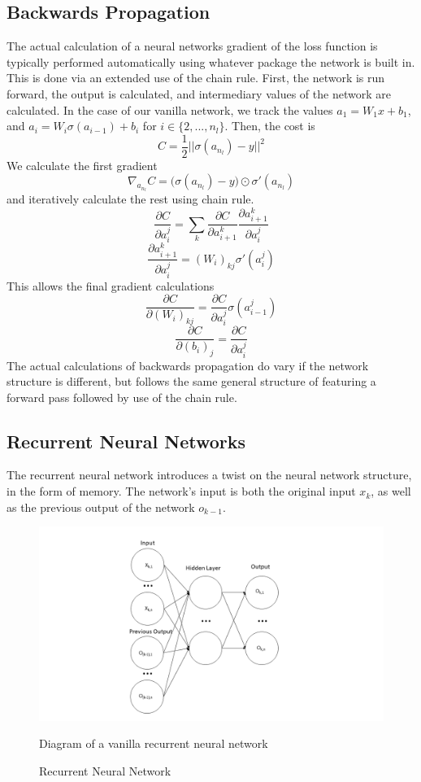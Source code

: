 \subsection{Backwards Propagation}
The actual calculation of a neural networks gradient of the loss function is typically performed automatically using whatever package the network is built in. This is done via an extended use of the chain rule. First, the network is run forward, the output is calculated, and intermediary values of the network are calculated. In the case of our vanilla network, we track the values $a_1 = W_1x + b_1$, and $a_i = W_i\sigma(a_{i-1})+b_i$ for $i\in\{2,...,n_l\}$. Then, the cost is \[C = \frac{1}{2}||\sigma(a_{n_l})-y||^2\] We calculate the first gradient \[\nabla_{a_{n_l}} C = \Big(\sigma(a_{n_l})-y\Big)\odot\sigma'(a_{n_l})\] and iteratively calculate the rest using chain rule. \[\frac{\partial C}{\partial{a_i^j}}= \sum_k\frac{\partial C}{\partial a_{i+1}^k}\frac{\partial  a_{i+1}^k}{\partial{a_i^j}}\] \[\frac{\partial  a_{i+1}^k}{\partial{a_i^j}} = (W_i)_{kj} \sigma'(a_i^j)\] 
This allows the final gradient calculations \[\frac{\partial C}{\partial (W_i)_{kj}} = \frac{\partial C}{\partial a_i^j}\sigma(a_{i-1}^j)\]
 \[\frac{\partial C}{\partial (b_i)_{j}} = \frac{\partial C}{\partial a_i^j}\]
 The actual calculations of backwards propagation do vary if the network structure is different, but follows the same general structure of featuring a forward pass followed by use of the chain rule.
\subsection{Recurrent Neural Networks }The recurrent neural network introduces a twist on the neural network structure, in the form of memory. The network's input is both the original input $x_k$, as well as the previous output of the network $o_{k-1}$.
\begin{figure}
    \centering
    \includegraphics[width=1.0\textwidth]{figures/RNN.png}
    \caption{Recurrent Neural Network}
    \label{fig:rnn}
    Diagram of a vanilla recurrent neural network
\end{figure}
